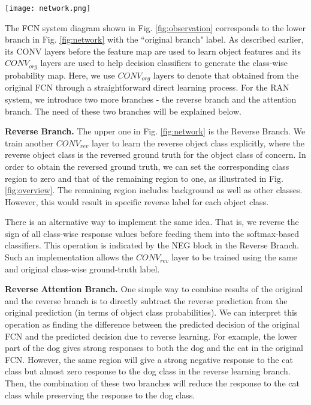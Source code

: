 \documentclass[runningheads]{llncs}
\begin{document}
\begin{figure*}
\begin{center}
\texttt{[image: network.png]}
\end{center}
\caption{The system diagram of the reverse attention network (RAN), where
$CONV_{org}$ and $CONV_{rev}$ filters are used to learn features associated and
not associated with a particular class, respectively.  The reverse object 
class knowledge is then highlighted by an attention mask to generate the
reverse attention of a class, which will then be subtracted from the
original prediction score as a correction.} \label{fig:network}
\end{figure*}


The FCN system diagram shown in Fig. \ref{fig:observation} corresponds
to the lower branch in Fig. \ref{fig:network} with the ``original
branch" label. As described earlier, its CONV layers before the feature
map are used to learn object features and its $CONV_{org}$ layers are used
to help decision classifiers to generate the class-wise probability map.
Here, we use $CONV_{org}$ layers to denote that obtained from the original
FCN through a straightforward direct learning process.  For the RAN
system, we introduce two more branches - the reverse branch and the
attention branch. The need of these two branches will be explained
below.

{\bf Reverse Branch.} The upper one in Fig. \ref{fig:network} is the
Reverse Branch. We train another $CONV_{rev}$ layer to learn the reverse
object class explicitly, where the reverse object class is the reversed
ground truth for the object class of concern. In order to obtain the
reversed ground truth, we can set the corresponding class region to zero
and that of the remaining region to one, as illustrated in Fig. \ref{fig:overview}. The remaining region includes
background as well as other classes. However, this would result in specific reverse label for each object class.

There is an alternative way to
implement the same idea. That is, we reverse the sign of all class-wise
response values before feeding them into the softmax-based classifiers.
This operation is indicated by the NEG block in the Reverse Branch. Such
an implementation allows the $CONV_{rev}$ layer to be trained using the same
and original class-wise ground-truth label. 

{\bf Reverse Attention Branch.} 
One simple way to combine results of the original and the reverse
branch is to directly subtract the reverse prediction from the original prediction (in terms of object class
probabilities). We can interpret this operation as finding the
difference between the predicted decision of the original FCN and the
predicted decision due to reverse learning. For example, the lower part
of the dog gives strong responses to both the dog and the cat in the
original FCN. However, the same region will give a strong negative
response to the cat class but almost zero response to the dog class in
the reverse learning branch. Then, the combination of these two branches
will reduce the response to the cat class while preserving the response
to the dog class.
\end{document}
